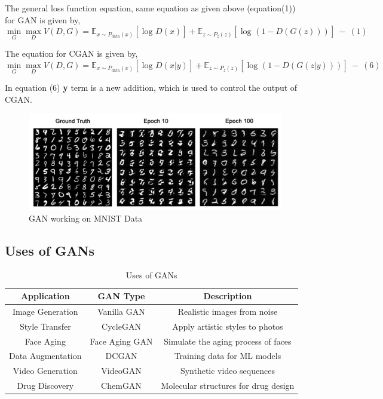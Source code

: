 \noindent
The general loss function equation, same equation as given above (equation(1)) for GAN is given by,
\[
\min_G \max_D V(D,G) = \mathbb{E}_{x\sim P_{\text{data}}(x)}\left[\log_{}D(x)\right] + \mathbb{E}_{z\sim P_z(z)}\left[\log_{}(1-D(G(z)))\right]~-~(1)
\]

\noindent
The equation for CGAN is given by,
\[
\min_G \max_D V(D,G) = \mathbb{E}_{x\sim P_{\text{data}}(x)}\left[\log_{}D(x|y)\right] + \mathbb{E}_{z\sim P_z(z)}\left[\log_{}(1-D(G(z|y)))\right]~-~(6)
\]

\noindent
In equation (6) \textbf{y} term is a new addition, which is used to control the output of CGAN.

\begin{figure}[h!]
    \centering
    \includegraphics[width=\textwidth]{Images/gan_mnist.jpg}
    \caption[GAN working on MNIST Data]{GAN working on MNIST Data\cite{GAN_Main}}
\end{figure}

\clearpage

\subsection{Uses of GANs}

\begin{table}[h!]
\centering
\caption{Uses of GANs}
\begin{tabular}{|c|c|c|}
\hline
\textbf{Application} & \textbf{GAN Type} & \textbf{Description} \\
\hline
Image Generation & Vanilla GAN & Realistic images from noise \\
\hline
Style Transfer & CycleGAN & Apply artistic styles to photos \\
\hline
Face Aging & Face Aging GAN\cite{Face_Aging_GAN} & Simulate the aging process of faces \\
\hline
Data Augmentation & DCGAN & Training data for ML models \\
\hline
Video Generation & VideoGAN\cite{VideoGAN} & Synthetic video sequences \\
\hline
Drug Discovery & ChemGAN\cite{ChemGAN} & Molecular structures for drug design \\
\hline
\end{tabular}
\end{table}

